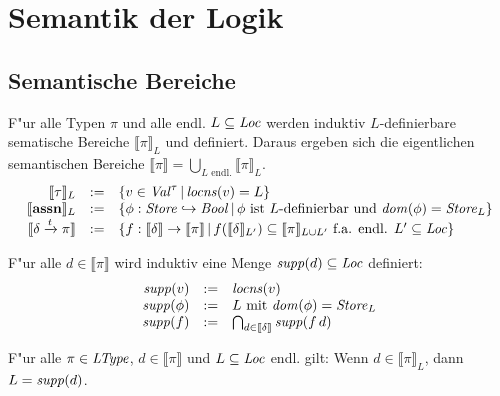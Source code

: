 \documentclass[12pt,a4paper,bigheadings]{scrartcl}
\newcommand{\semantic}[1]{\ensuremath{\llbracket#1\rrbracket}}
\newcommand{\assn}{\ensuremath{\mathbf{assn}}}
\newcommand{\locns}{\name{locns}}
\newcommand{\supp}{\name{supp}}
\newcommand{\tto}{\ensuremath{\xrightarrow{t}}}
\begin{document}
\section{Semantik der Logik}

\subsection{Semantische Bereiche}

F"ur alle Typen $\pi$ und alle endl. $L \subseteq {\text{\it Loc\/}}$ werden induktiv $L$-definierbare
sematische Bereiche $\semantic{\pi}_L$ und definiert. Daraus ergeben sich die eigentlichen
semantischen Bereiche $\semantic{\pi} = \bigcup\limits_{L \text{ endl.}} \semantic{\pi}_L$.
\[\begin{array}{rcl}
  \semantic{\tau}_L &:=& \{v \in \Val^\tau\,|\,\locns(v) = L\} \\
  \semantic{\assn}_L &:=& \{\phi:\Store\pto\Bool\,|\,\text{$\phi$ ist $L$-definierbar und $\dom{\phi} = \Store_L$}\} \\
  \semantic{\delta \tto \pi} &:=& \{f:\semantic{\delta}\to\semantic{\pi}\,|\,
                                       \text{$f(\semantic{\delta}_{L'}) \subseteq \semantic{\pi}_{L\cup L'}$ f.a. endl. $L'\subseteq\Loc$}\}
\end{array}\]

\begin{definition}[Support]
  F"ur alle $d \in \semantic{\pi}$ wird induktiv eine Menge $\supp(d) \subseteq \Loc$ definiert:
  \[\begin{array}{rcl}
    \supp(v) &:=& \locns(v) \\
    \supp(\phi) &:=& L \text{ mit } \dom{\phi} = \Store_L \\
    \supp(f) &:=& \bigcap_{d\in\semantic{\delta}} \supp(f\,d)
  \end{array}\]
\end{definition}

\begin{lemma}[Support]
  F"ur alle $\pi\in{\text{\it LType\/}}$, $d\in\semantic{\pi}$ und $L \subseteq {\text{\it Loc\/}}$ endl. gilt:
  Wenn $d \in \semantic{\pi}_L$, dann $L = \supp(d)$.
\end{lemma}
\end{document}
